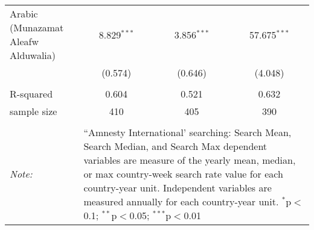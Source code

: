 \begin{table}[!htbp]
\begin{tabular}{@{\extracolsep{5pt}}lccc}
  Arabic (Munazamat Aleafw Alduwalia) & 8.829$^{***}$ & 3.856$^{***}$ & 57.675$^{***}$ \\ 
  & (0.574) & (0.646) & (4.048) \\ 
 \hline \\[-1.8ex] 
R-squared  & 0.604 & 0.521 & 0.632 \\ 
sample size  & 410 & 405 & 390 \\ 
\hline 
\hline \\[-1.8ex] 
\textit{Note:}  & \multicolumn{3}{l}{\parbox[t]{8cm}{``Amnesty International' searching: Search Mean, Search Median, and Search Max dependent variables are measure of the yearly mean, median, or max country-week search rate value for each country-year unit. Independent variables are measured annually for each country-year unit. $^{*}$p$<$0.1; $^{**}$p$<$0.05; $^{***}$p$<$0.01}} \\ 
\end{tabular} 
\end{table} 
